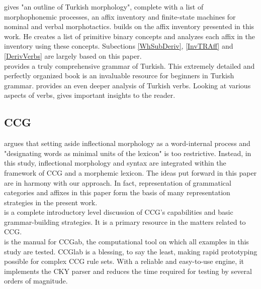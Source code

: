 \documentclass[11pt]{article} %
\begin{document}
\citet{OflazerGocmenBozsahin1995} gives "an outline of Turkish morphology", complete with a list of morphophonemic processes, an affix inventory and finite-state machines for nominal and verbal morphotactics. \citet{Bozsahin2018} builds on the affix inventory presented in this work. He creates a list of primitive binary concepts and analyzes each affix in the inventory using these concepts. Subections \ref{WhSubDeriv}, \ref{InvTRAff} and \ref{DerivVerbs} are largely based on this paper. \\ 

\citet{GokselKerslake2005} provides a truly comprehensive grammar of Turkish. This extremely detailed and perfectly organized book is an invaluable resource for beginners in Turkish grammar. \citet{Taylan2001} provides an even deeper analysis of Turkish verbs. Looking at various aspects of verbs, \citet{Taylan2001} gives important insights to the reader. \\

\subsection{CCG}

\citet{Bozsahin2002} argues that setting aside inflectional morphology as a word-internal process and "designating words as minimal units of the lexicon" is too restrictive. Instead, in this study, inflectional morphology and syntax are integrated within the framework of CCG and a morphemic lexicon. The ideas put forward in this paper are in harmony with our approach. In fact, representation of grammatical categories and affixes in this paper form the basis of many representation strategies in the present work. \\



\citet{SteedmanBaldridge2011} is a complete introductory level discussion of CCG's capabilities and basic grammar-building strategies. It is a primary resource in the matters related to CCG. \\

\citet{Bozsahin2017} is the manual for CCGab, the computational tool on which all examples in this study are tested. CCGlab is a blessing, to say the least, making rapid prototyping possible for complex CCG rule sets. With a reliable and easy-to-use engine, it implements the CKY parser and reduces the time required for testing by several orders of magnitude. \\
\end{document}
